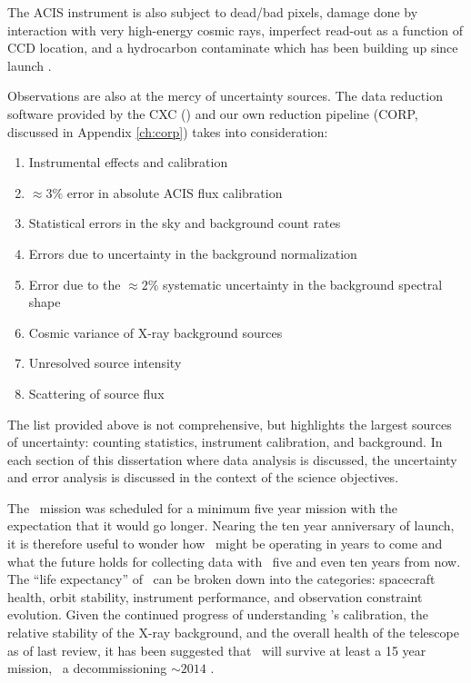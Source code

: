 The ACIS instrument is also subject to dead/bad pixels, damage done by
interaction with very high-energy cosmic rays, imperfect read-out as a
function of CCD location, and a hydrocarbon contaminate which has been
building up since launch \citep{aciscontaminant}.

Observations are also at the mercy of uncertainty sources. The data
reduction software provided by the CXC (\ciao) and our own reduction
pipeline (CORP, discussed in Appendix \ref{ch:corp}) takes into
consideration:
\begin{enumerate}
\item Instrumental effects and calibration
\item $\approx 3\%$ error in absolute ACIS flux calibration
\item Statistical errors in the sky and background count rates
\item Errors due to uncertainty in the background normalization
\item Error due to the $\approx 2\%$ systematic uncertainty in the
background spectral shape
\item Cosmic variance of X-ray background sources
\item Unresolved source intensity
\item Scattering of source flux
\end{enumerate}

The list provided above is not comprehensive, but highlights the
largest sources of uncertainty: counting statistics, instrument
calibration, and background. In each section of this dissertation
where data analysis is discussed, the uncertainty and error analysis
is discussed in the context of the science objectives.

The \chandra\ mission was scheduled for a minimum five year mission
with the expectation that it would go longer. Nearing the ten year
anniversary of launch, it is therefore useful to wonder how
\chandra\ might be operating in years to come and what the future
holds for collecting data with \chandra\ five and even ten years from
now. The ``life expectancy'' of \chandra\ can be broken down into the
categories: spacecraft health, orbit stability, instrument
performance, and observation constraint evolution. Given the continued
progress of understanding \chandra's calibration, the relative
stability of the X-ray background, and the overall health of the
telescope as of last review, it has been suggested that \chandra\ will
survive at least a 15 year mission, \eg\ a decommissioning $\sim2014$
\citep{2007CUC, 2008ChNew..15...21B}.

